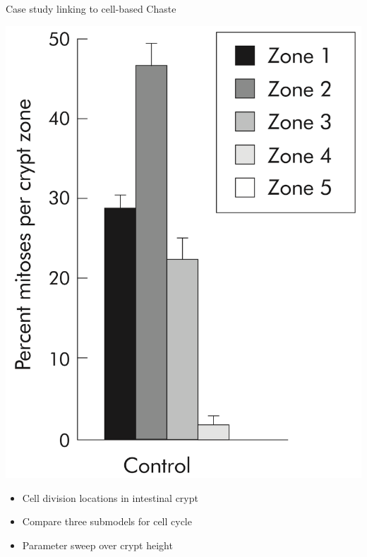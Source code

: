 \documentclass[t,xcolor={usenames,dvipsnames}]{beamer}
\begin{document}
\begin{frame}{Case study linking to cell-based Chaste}
\begin{minipage}{0.39\textwidth}
\includegraphics[width=.9\textwidth]{WongFigure}
\end{minipage}
\begin{minipage}{0.31\textwidth}
\begin{itemize}
\item Cell division locations in intestinal crypt
\item Compare three submodels for cell cycle
\item Parameter sweep over crypt height
\end{itemize}
\end{minipage}
\end{frame}
\end{document}
